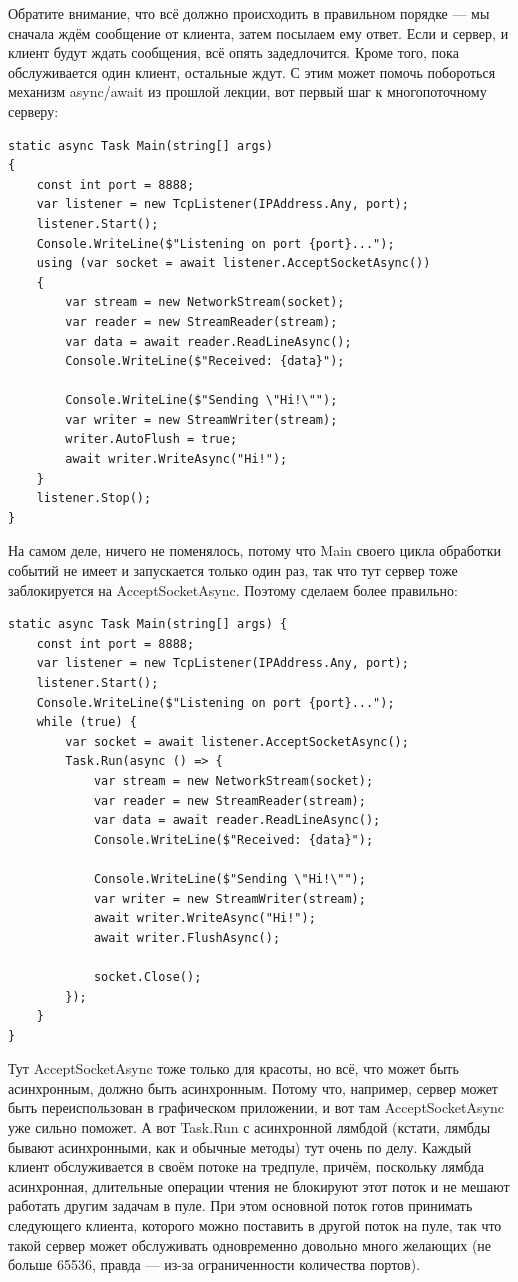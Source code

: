 \documentclass[a5paper]{article}
\begin{document}
Обратите внимание, что всё должно происходить в правильном порядке --- мы сначала ждём сообщение от клиента, затем посылаем ему ответ. Если и сервер, и клиент будут ждать сообщения, всё опять задедлочится. Кроме того, пока обслуживается один клиент, остальные ждут. С этим может помочь побороться механизм async/await из прошлой лекции, вот первый шаг к многопоточному серверу:

\begin{verbatim}
static async Task Main(string[] args)
{
    const int port = 8888;
    var listener = new TcpListener(IPAddress.Any, port);
    listener.Start();
    Console.WriteLine($"Listening on port {port}...");
    using (var socket = await listener.AcceptSocketAsync())
    {
        var stream = new NetworkStream(socket);
        var reader = new StreamReader(stream);
        var data = await reader.ReadLineAsync();
        Console.WriteLine($"Received: {data}");

        Console.WriteLine($"Sending \"Hi!\"");
        var writer = new StreamWriter(stream);
        writer.AutoFlush = true;
        await writer.WriteAsync("Hi!");
    }
    listener.Stop();
}
\end{verbatim}

На самом деле, ничего не поменялось, потому что Main своего цикла обработки событий не имеет и запускается только один раз, так что тут сервер тоже заблокируется на AcceptSocketAsync. Поэтому сделаем более правильно:

\begin{verbatim}
static async Task Main(string[] args) {
    const int port = 8888;
    var listener = new TcpListener(IPAddress.Any, port);
    listener.Start();
    Console.WriteLine($"Listening on port {port}...");
    while (true) {
        var socket = await listener.AcceptSocketAsync();
        Task.Run(async () => {
            var stream = new NetworkStream(socket);
            var reader = new StreamReader(stream);
            var data = await reader.ReadLineAsync();
            Console.WriteLine($"Received: {data}");

            Console.WriteLine($"Sending \"Hi!\"");
            var writer = new StreamWriter(stream);
            await writer.WriteAsync("Hi!");
            await writer.FlushAsync();

            socket.Close();
        });
    }
}
\end{verbatim}

Тут AcceptSocketAsync тоже только для красоты, но всё, что может быть асинхронным, должно быть асинхронным. Потому что, например, сервер может быть переиспользован в графическом приложении, и вот там AcceptSocketAsync уже сильно поможет. А вот Task.Run с асинхронной лямбдой (кстати, лямбды бывают асинхронными, как и обычные методы) тут очень по делу. Каждый клиент обслуживается в своём потоке на тредпуле, причём, поскольку лямбда асинхронная, длительные операции чтения не блокируют этот поток и не мешают работать другим задачам в пуле. При этом основной поток готов принимать следующего клиента, которого можно поставить в другой поток на пуле, так что такой сервер может обслуживать одновременно довольно много желающих (не больше 65536, правда --- из-за ограниченности количества портов).
\end{document}
